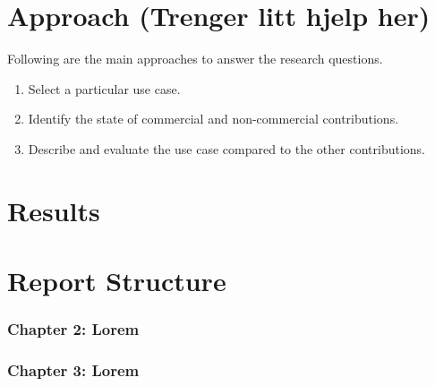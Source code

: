 \section{Approach (Trenger litt hjelp her)}
Following are the main approaches to answer the research questions.

\begin{enumerate}
	\item Select a particular use case.
	\item Identify the state of commercial and non-commercial contributions.
	\item Describe and evaluate the use case compared to the other contributions.
\end{enumerate}


\section{Results}


\section{Report Structure}

\subsubsection{Chapter 2: Lorem}

\subsubsection{Chapter 3: Lorem}